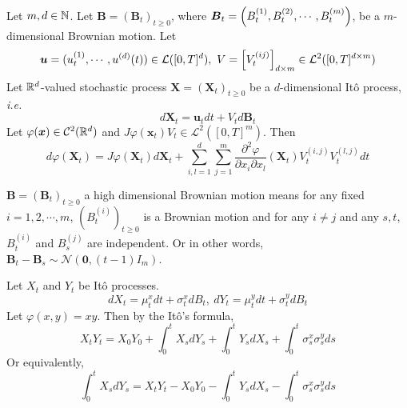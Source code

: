 \documentclass[a4paper,12pt]{article}
\begin{document}
\begin{itemize}
  \begin{thm}
    Let $m,d \in \mathbb{N}$. Let $\boldsymbol{B} = (\boldsymbol{B}_t)_{t \geqslant 0}$, where $\boldsymbol{B}_t = \left(B^{(1)}_t,B^{(2)}_t,\cdots,B^{(m)}_t\right)$, be a $m$-dimensional Brownian motion. Let
    \begin{equation*}
      \boldsymbol{u} = (u^{(1)}_t,\cdots,u^{(d)}(t)) \in \mathcal{L}([0,T]^d),~V = \left[V^{(ij)}_t\right]_{d\times m} \in \mathcal{L}^2([0,T]^{d\times m})
    \end{equation*}
    Let $\mathbb{R}^d$-valued stochastic process $\boldsymbol{X} = (\boldsymbol{X}_t)_{t \geqslant 0}$ be a $d$-dimensional It\^o process, \emph{i.e.}
    \begin{equation*}
      d\boldsymbol{X}_t = \boldsymbol{u}_tdt + V_td\boldsymbol{B}_t
    \end{equation*}
    Let $\varphi(\boldsymbol{x}) \in \mathcal{C}^{2}(\mathbb{R}^d)$ and $J\varphi(\boldsymbol{x}_t)V_t \in \mathcal{L}^2([0,T]^m)$. Then
    \begin{equation*}
      d\varphi(\boldsymbol{X}_t) = J\varphi(\boldsymbol{X}_t)d\boldsymbol{X}_t + \sum_{i,l=1}^d \sum_{j=1}^m\frac{\partial^2 \varphi}{\partial x_i \partial x_l}(\boldsymbol{X}_t)V_t^{(i,j)}V_t^{(l,j)}dt
    \end{equation*}
  \end{thm}
  \begin{rmk}
    $\boldsymbol{B} = (\boldsymbol{B}_t)_{t \geqslant 0}$ a high dimensional Brownian motion means for any fixed $i=1,2,\cdots,m$, $(B^{(i)}_t)_{t \geqslant 0}$ is a Brownian motion and for any $i\neq j$ and any $s, t$, $B^{(i)}_t$ and $B^{(j)}_s$ are independent. Or in other words, $\boldsymbol{B}_t - \boldsymbol{B}_s \sim \mathcal{N}(\boldsymbol{0}, (t-1)I_m)$.
  \end{rmk}
  \begin{cor}
    Let $X_t$ and $Y_t$ be It\^o processes.
    \begin{equation*}
      dX_t = \mu^x_tdt + \sigma_t^xdB_t,~dY_t = \mu^y_tdt + \sigma_t^ydB_t
    \end{equation*}
    Let $\varphi(x,y) = xy$. Then by the It\^o's formula,
    \begin{equation*}
      X_tY_t = X_0Y_0 + \int_0^tX_sdY_s + \int_0^t Y_sdX_s + \int_0^t \sigma_s^x\sigma_s^yds
    \end{equation*}
    Or equivalently,
    \begin{equation*}
      \int_0^tX_sdY_s = X_tY_t - X_0Y_0 -\int_0^t Y_sdX_s - \int_0^t \sigma_s^x\sigma_s^yds
    \end{equation*}
  \end{cor}


\end{itemize}
\end{document}
